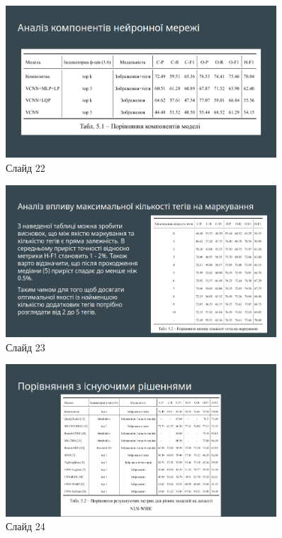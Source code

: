 \documentclass{udstu}
\begin{document}
\begin{figure}[!ht]
	\centering
	\includegraphics[width=0.9\textwidth]{PNG/present/present-22}
	\caption{Слайд 22}
\end{figure}

\begin{figure}[!ht]
	\centering
	\includegraphics[width=0.9\textwidth]{PNG/present/present-23}
	\caption{Слайд 23}
\end{figure}

\begin{figure}[!ht]
	\centering
	\includegraphics[width=0.9\textwidth]{PNG/present/present-24}
	\caption{Слайд 24}
\end{figure}
\end{document}

